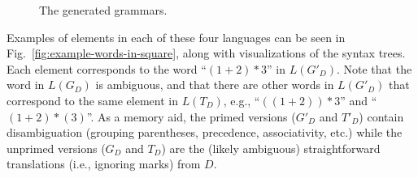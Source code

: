 \documentclass[runningheads]{llncs}
\begin{document}
\begin{figure}
  \caption{The generated grammars.}
  \label{fig:running-example-generated}
\end{figure}

Examples of elements in each of these four languages can be seen in Fig.~\ref{fig:example-words-in-square}, along with visualizations of the syntax trees. Each element corresponds to the word ``$(1 + 2) * 3$'' in $L(G'_D)$. Note that the word in $L(G_D)$ is ambiguous, and that there are other words in $L(G'_D)$ that correspond to the same element in $L(T_D)$, e.g., ``$((1 + 2)) * 3$'' and ``$(1 + 2) * (3)$''. As a memory aid, the primed versions ($G'_D$ and $T'_D$) contain disambiguation (grouping parentheses, precedence, associativity, etc.) while the unprimed versions ($G_D$ and $T_D$) are the (likely ambiguous) straightforward translations (i.e., ignoring marks) from $D$.
\end{document}
